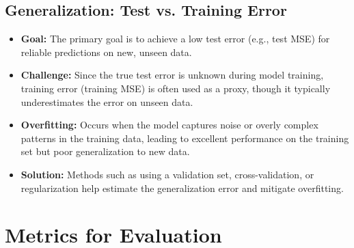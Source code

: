 \documentclass[11pt]{article}
\begin{document}
\subsection{Generalization: Test vs. Training Error}
\begin{itemize}
    \item \textbf{Goal:} The primary goal is to achieve a low test error (e.g., test MSE) for reliable predictions on new, unseen data.
    \item \textbf{Challenge:} Since the true test error is unknown during model training, training error (training MSE) is often used as a proxy, though it typically underestimates the error on unseen data.
    \item \textbf{Overfitting:} Occurs when the model captures noise or overly complex patterns in the training data, leading to excellent performance on the training set but poor generalization to new data.
    \item \textbf{Solution:} Methods such as using a validation set, cross-validation, or regularization help estimate the generalization error and mitigate overfitting.
\end{itemize}

\section{Metrics for Evaluation}
\end{document}
